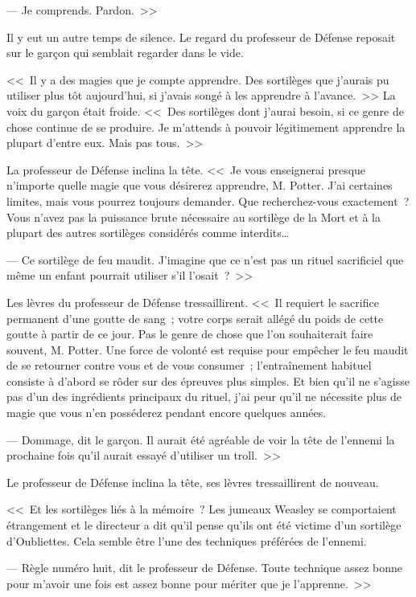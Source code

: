 --- Je comprends. Pardon.~>>

Il y eut un autre temps de silence. Le regard du professeur de Défense reposait sur le garçon qui semblait regarder dans le vide.

<<~Il y a des magies que je compte apprendre. Des sortilèges que j'aurais pu utiliser plus tôt aujourd'hui, si j'avais songé à les apprendre à l'avance.~>> La voix du garçon était froide. <<~Des sortilèges dont j'aurai besoin, si ce genre de chose continue de se produire. Je m'attends à pouvoir légitimement apprendre la plupart d'entre eux. Mais pas tous.~>>

La professeur de Défense inclina la tête. <<~Je vous enseignerai presque n'importe quelle magie que vous désirerez apprendre, M. Potter. J'ai certaines limites, mais vous pourrez toujours demander. Que recherchez-vous exactement~? Vous n'avez pas la puissance brute nécessaire au sortilège de la Mort et à la plupart des autres sortilèges considérés comme interdits…

--- Ce sortilège de feu maudit. J'imagine que ce n'est pas un rituel sacrificiel que même un enfant pourrait utiliser s'il l'osait~?~>>

Les lèvres du professeur de Défense tressaillirent. <<~Il requiert le sacrifice permanent d'une goutte de sang~; votre corps serait allégé du poids de cette goutte à partir de ce jour. Pas le genre de chose que l'on souhaiterait faire souvent, M. Potter. Une force de volonté est requise pour empêcher le feu maudit de se retourner contre vous et de vous consumer~; l'entraînement habituel consiste à d'abord se rôder sur des épreuves plus simples. Et bien qu'il ne s'agisse pas d'un des ingrédients principaux du rituel, j'ai peur qu'il ne nécessite plus de magie que vous n'en posséderez pendant encore quelques années.

--- Dommage, dit le garçon. Il aurait été agréable de voir la tête de l'ennemi la prochaine fois qu'il aurait essayé d'utiliser un troll.~>>

Le professeur de Défense inclina la tête, ses lèvres tressaillirent de nouveau.

<<~Et les sortilèges liés à la mémoire~? Les jumeaux Weasley se comportaient étrangement et le directeur a dit qu'il pense qu'ils ont été victime d'un sortilège d'Oubliettes. Cela semble être l'une des techniques préférées de l'ennemi.

--- Règle numéro huit, dit le professeur de Défense. Toute technique assez bonne pour m'avoir une fois est assez bonne pour mériter que je l'apprenne.~>>

